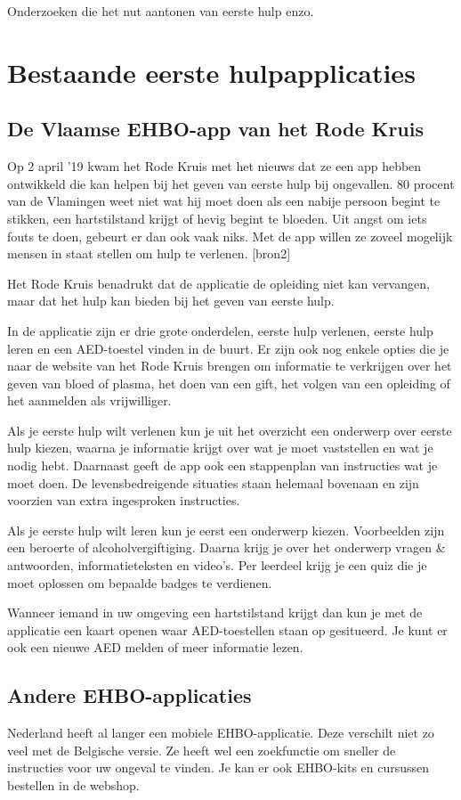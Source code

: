 Onderzoeken die het nut aantonen van eerste hulp enzo.

\section{Bestaande eerste hulpapplicaties}
\subsection{De Vlaamse EHBO-app van het Rode Kruis}
Op 2 april ’19 kwam het Rode Kruis met het nieuws dat ze een app hebben ontwikkeld die kan helpen bij het geven van eerste hulp bij ongevallen. 80 procent van de Vlamingen weet niet wat hij moet doen als een nabije persoon begint te stikken, een hartstilstand krijgt of hevig begint te bloeden. Uit angst om iets fouts te doen, gebeurt er dan ook vaak niks. Met de app willen ze zoveel mogelijk mensen in staat stellen om hulp te verlenen. [bron2]

Het Rode Kruis benadrukt dat de applicatie de opleiding niet kan vervangen, maar dat het hulp kan bieden bij het geven van eerste hulp.

In de applicatie zijn er drie grote onderdelen, eerste hulp verlenen, eerste hulp leren en een AED-toestel vinden in de buurt. Er zijn ook nog enkele opties die je naar de website van het Rode Kruis brengen om informatie te verkrijgen over het geven van bloed of plasma, het doen van een gift, het volgen van een opleiding of het aanmelden als vrijwilliger.

Als je eerste hulp wilt verlenen kun je uit het overzicht een onderwerp over eerste hulp kiezen, waarna je informatie krijgt over wat je moet vaststellen en wat je nodig hebt. Daarnaast geeft de app ook een stappenplan van instructies wat je moet doen. De levensbedreigende situaties staan helemaal bovenaan en zijn voorzien van extra ingesproken instructies.

Als je eerste hulp wilt leren kun je eerst een onderwerp kiezen. Voorbeelden zijn een beroerte of alcoholvergiftiging. Daarna krijg je over het onderwerp vragen \& antwoorden, informatieteksten en video's. Per leerdeel krijg je een quiz die je moet oplossen om bepaalde badges te verdienen.

Wanneer iemand in uw omgeving een hartstilstand krijgt dan kun je met de applicatie een kaart openen waar AED-toestellen staan op gesitueerd. Je kunt er ook een nieuwe AED melden of meer informatie lezen.


\subsection{Andere EHBO-applicaties}
Nederland heeft al langer een mobiele EHBO-applicatie. Deze verschilt niet zo veel met de Belgische versie. Ze heeft wel een zoekfunctie om sneller de instructies voor uw ongeval te vinden. Je kan er ook EHBO-kits en cursussen bestellen in de webshop.
